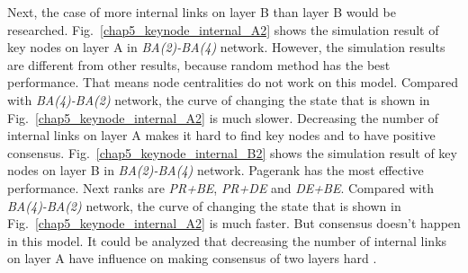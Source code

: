 Next, the case of more internal links on layer B than layer B would be researched. 
Fig.~\ref{chap5_keynode_internal_A2} shows the simulation result of key nodes on layer A in \textit{BA(2)-BA(4)} network. However, the simulation results are different from other results, because random method has the best performance. That means node centralities do not work on this model. Compared with \textit{BA(4)-BA(2)} network, the curve of changing the state that is shown in Fig.~\ref{chap5_keynode_internal_A2}  is much slower. Decreasing the number of internal links on layer A makes it hard to find key nodes and to have positive consensus. 
Fig.~\ref{chap5_keynode_internal_B2} shows the simulation result of key nodes on layer B in \textit{BA(2)-BA(4)} network. Pagerank has the most effective performance. Next ranks are \textit{PR+BE}, \textit{PR+DE} and \textit{DE+BE}. Compared with \textit{BA(4)-BA(2)} network, the curve of changing the state that is shown in Fig.~\ref{chap5_keynode_internal_A2}  is much faster. But consensus doesn't happen in this model. It could be analyzed that decreasing the number of internal links on layer A have influence on making consensus of two layers hard .   

